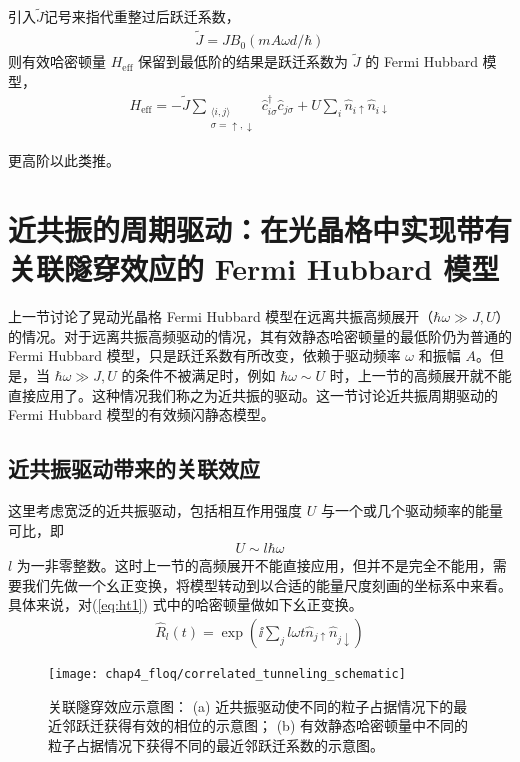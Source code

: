引入$\tilde{J}$记号来指代重整过后跃迁系数，
\begin{align}
\tilde{J} = JB_0(mA\omega d/\hbar) 
\end{align}
则有效哈密顿量 $H_{\text{eff}}$ 保留到最低阶的结果是跃迁系数为 $\tilde{J}$ 的 Fermi Hubbard 模型，
\begin{align}
H_{\text{eff}} = -\tilde{J} \sum_{\substack{\langle i,j\rangle \\ \sigma = \uparrow,\downarrow}} \hat{c}_{i\sigma}^{\dagger}\hat{c}_{j\sigma}+U\sum_i\hat{n}_{i\uparrow}\hat{n}_{i\downarrow}
\end{align}

更高阶以此类推。





\section{近共振的周期驱动：在光晶格中实现带有关联隧穿效应的 Fermi Hubbard 模型}\label{sec:floq:resona}

上一节讨论了晃动光晶格 Fermi Hubbard 模型在远离共振高频展开（$\hbar\omega\gg J, U$）的情况。对于远离共振高频驱动的情况，其有效静态哈密顿量的最低阶仍为普通的 Fermi Hubbard 模型，只是跃迁系数有所改变，依赖于驱动频率 $\omega$ 和振幅 $A$。但是，当 $\hbar\omega\gg J, U$ 的条件不被满足时，例如 $\hbar\omega\sim U$ 时，上一节的高频展开就不能直接应用了。这种情况我们称之为近共振的驱动。这一节讨论近共振周期驱动的 Fermi Hubbard 模型的有效频闪静态模型。

\subsection{近共振驱动带来的关联效应}
这里考虑宽泛的近共振驱动，包括相互作用强度 $U$ 与一个或几个驱动频率的能量可比，即
\begin{align}
U\sim l\hbar\omega
\end{align}
$l$ 为一非零整数。这时上一节的高频展开不能直接应用，但并不是完全不能用，需要我们先做一个幺正变换，将模型转动到以合适的能量尺度刻画的坐标系中来看。具体来说，对(\ref{eq:ht1}) 式中的哈密顿量做如下幺正变换。
\begin{align}
\hat{R}_l(t) = \exp(\ii\sum_jl\omega t\hat{n}_{j\uparrow}\hat{n}_{j\downarrow})
\end{align}
\begin{figure}[!htb]
\centering
\texttt{[image: chap4\_floq/correlated\_tunneling\_schematic]}
\caption{关联隧穿效应示意图：
(a) 近共振驱动使不同的粒子占据情况下的最近邻跃迁获得有效的相位的示意图；
(b) 有效静态哈密顿量中不同的粒子占据情况下获得不同的最近邻跃迁系数的示意图。}
\label{fig:floq:corrtunn}
\end{figure}

